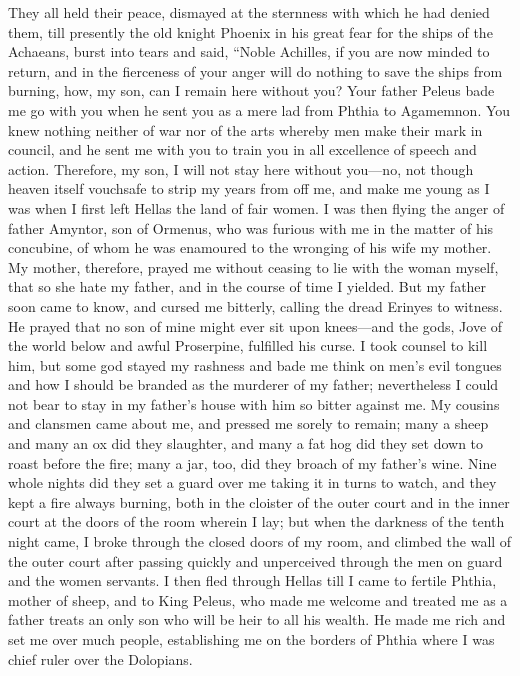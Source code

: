 They all held their peace, dismayed at the sternness with which he had
denied them, till presently the old knight Phoenix in his great fear for
the ships of the Achaeans, burst into tears and said, “Noble Achilles, if
you are now minded to return, and in the fierceness of your anger will do
nothing to save the ships from burning, how, my son, can I remain here
without you? Your father Peleus bade me go with you when he sent you as a
mere lad from Phthia to Agamemnon. You knew nothing neither of war nor of
the arts whereby men make their mark in council, and he sent me with you
to train you in all excellence of speech and action. Therefore, my son, I
will not stay here without you—no, not though heaven itself
vouchsafe to strip my years from off me, and make me young as I was when I
first left Hellas the land of fair women. I was then flying the anger of
father Amyntor, son of Ormenus, who was furious with me in the matter of
his concubine, of whom he was enamoured to the wronging of his wife my
mother. My mother, therefore, prayed me without ceasing to lie with the
woman myself, that so she hate my father, and in the course of time I
yielded. But my father soon came to know, and cursed me bitterly, calling
the dread Erinyes to witness. He prayed that no son of mine might ever sit
upon knees—and the gods, Jove of the world below and awful
Proserpine, fulfilled his curse. I took counsel to kill him, but some god
stayed my rashness and bade me think on men’s evil tongues and how I
should be branded as the murderer of my father; nevertheless I could not
bear to stay in my father’s house with him so bitter against me. My
cousins and clansmen came about me, and pressed me sorely to remain; many
a sheep and many an ox did they slaughter, and many a fat hog did they set
down to roast before the fire; many a jar, too, did they broach of my
father’s wine. Nine whole nights did they set a guard over me taking it in
turns to watch, and they kept a fire always burning, both in the cloister
of the outer court and in the inner court at the doors of the room wherein
I lay; but when the darkness of the tenth night came, I broke through the
closed doors of my room, and climbed the wall of the outer court after
passing quickly and unperceived through the men on guard and the women
servants. I then fled through Hellas till I came to fertile Phthia, mother
of sheep, and to King Peleus, who made me welcome and treated me as a
father treats an only son who will be heir to all his wealth. He made me
rich and set me over much people, establishing me on the borders of Phthia
where I was chief ruler over the Dolopians.

